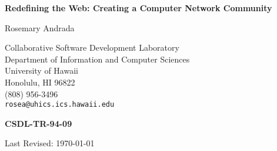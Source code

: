 



\vspace*{1in}

\begin{center}
  {\Large\bf Redefining the Web: Creating a Computer Network Community}
  \bigskip\par

  Rosemary Andrada \bigskip\par

  Collaborative Software Development Laboratory\\ Department of
  Information and Computer Sciences\\ University of Hawaii\\ Honolulu, HI
  96822\\ (808) 956-3496\\ {\tt rosea@uhics.ics.hawaii.edu} \bigskip\par

  {\bf CSDL-TR-94-09} \bigskip\par

Last Revised: \today

\end{center}

\begin{abstract}

  Organizations are formed to accomplish a goal or mission, where
  individual members do their part and make a combined effort leading
  toward this goal.  As the organization grows in size, the level of
  community inevitably deteriorates.

  This research will investigate the strengths and weaknesses of a
  computer-based approach to improving the sense of community within one
  organization, the Department of Computer Science at the University of
  Hawaii.  We will assess the current level of community by administering
  a questionnaire to members of the department.  Next, we will introduce
  a World Wide Web information system for and about the department in an
  effort to impact the level of community that exists.  We will then
  administer another questionnaire to assess the level of community
  within the department after a period of use with the information
  system.  We will analyze the results of both questionnaires and usage
  statistics logged by the system.

\end{abstract}

